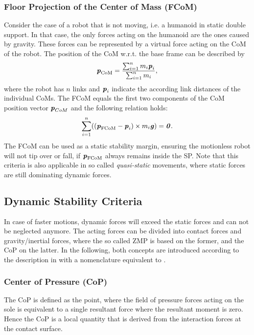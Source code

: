 \subsubsection{Floor Projection of the Center of Mass (FCoM)}
Consider the case of a robot that is not moving, i.e. a humanoid in static double support. In that case, the only forces acting on the humanoid are the ones caused by gravity. These forces can be represented by a virtual force acting on the \gls{CoM} of the robot. The position of the \gls{CoM} w.r.t. the base frame can be described by
\begin{equation*} 
\bm{\mathit{p}}_{\text{CoM}}=\dfrac{\sum_{i=1}^{n}m_i\bm{\mathit{p}}_i}{\sum_{i=1}^{n}m_i},
\end{equation*}
where the robot has $n$ links and $\bm{\mathit{p}}_i$ indicate the according link distances of the individual \gls{CoM}s. The \gls{FCoM} equals the first two components of the \gls{CoM} position vector $\bm{\mathit{p}}_{CoM}$ and the following relation holds:
\begin{equation*} 
\sum_{i=1}^{n}((\bm{\mathit{p}}_{\text{FCoM}}-\bm{\mathit{p}}_i)\times m_i\bm{\mathit{g}})=\bm{\mathit{0}}.
\end{equation*}
The \gls{FCoM} can be used as a static stability margin, ensuring the motionless robot will not tip over or fall, if $\bm{\mathit{p}}_{\text{FCoM}}$ always remains inside the \gls{SP}. Note that this criteria is also applicable in so called \textit{quasi-static} movements, where static forces are still dominating dynamic forces.

\subsection{Dynamic Stability Criteria}
In case of faster motions, dynamic forces will exceed the static forces and can not be neglected anymore. The acting forces can be divided into contact forces and gravity/inertial forces, where the so called \gls{ZMP} is based on the former, and the \gls{CoP} on the latter. In the following, both concepts are introduced according to the description in \cite{sardain2004forces} with a nomenclature equivalent to \cite{scaronTeaching}.
\subsubsection{Center of Pressure (CoP)}
The \gls{CoP} is defined as the point, where the field of pressure forces acting on the sole is equivalent to a single resultant force where the resultant moment is zero. Hence the \gls{CoP} is a local quantity that is derived from the interaction forces at the contact surface. 

